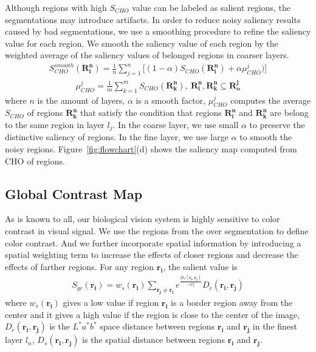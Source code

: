 \documentclass{article}
\begin{document}
Although regions with high $S_{CHO}$ value can be labeled as salient regions, the segmentations may introduce artifacts. In order to reduce noisy saliency results caused by bad segmentations, we use a smoothing procedure to refine the saliency value for each region. We smooth the saliency value of each region by the weighted average of the saliency values of belonged regions in coarser layers.
\begin{eqnarray}
	S_{CHO}^{smooth}(\mathbf{R_i^n}) = \frac{1}{n}\sum_{j=1}^n\big[(1-\alpha)S_{CHO}(\mathbf{R_i^n}) + \alpha\mu_{CHO}^j)]
\end{eqnarray}
\begin{eqnarray}
	\mu_{CHO}^j = \frac{1}{m}\sum_{k=1}^mS_{CHO}(\mathbf{R_k^n}),~\mathbf{R_i^n},\mathbf{R_k^n}\subseteq\mathbf{R_o^j}
\end{eqnarray}
where $n$ is the amount of layers, $\alpha$ is a smooth factor, $\mu_{CHO}^j$ computes the average $S_{CHO}$ of regions $\mathbf{R_k^n}$ that satisfy the condition that regions $\mathbf{R_i^n}$ and $\mathbf{R_k^n}$ are belong to the same region in layer $l_j$. In the coarse layer, we use small $\alpha$ to preserve the distinctive saliency of regions. In the fine layer, we use large $\alpha$ to smooth the noisy regions. Figure~\ref{fig:flowchart}(d) shows the saliency map computed from CHO of regions.

\subsection{Global Contrast Map}
As is known to all, our biological vision system is highly sensitive to color contrast in visual signal. We use the regions from the over segmentation to define color contrast. And we further incorporate spatial information by introducing a spatial weighting term to increase the effects of closer regions and decrease the effects of farther regions. For any region $\mathbf{r_i}$, the salient value is
\begin{eqnarray}
	S_{gc}(\mathbf{r_i}) = w_s(\mathbf{r_i})\sum_{\mathbf{r_j}\neq\mathbf{r_i}}e^{\frac{D_s(\mathbf{r_i},\mathbf{r_j})}{-\sigma_s^2}}D_c(\mathbf{r_i},\mathbf{r_j})
\end{eqnarray}
where $w_s(\mathbf{r_i})$ gives a low value if region $\mathbf{r_i}$ is a border region away from the center and it gives a high value if the region is close to the center of the image, $D_c(\mathbf{r_i},\mathbf{r_j})$ is the $L^*a^*b^*$ space distance between regions $\mathbf{r_i}$ and $\mathbf{r_j}$ in the finest layer $l_n$, $D_s(\mathbf{r_i},\mathbf{r_j})$ is the spatial distance between regions $\mathbf{r_i}$ and $\mathbf{r_j}$.
\end{document}
